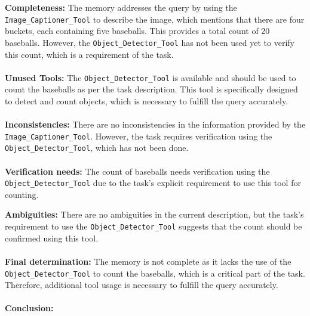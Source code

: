 \begin{plannerbox}
\textbf{Completeness:}
The memory addresses the query by using the \texttt{Image\_Captioner\_Tool} to describe the image, which mentions that there are four buckets, each containing five baseballs. This provides a total count of 20 baseballs. However, the \texttt{Object\_Detector\_Tool} has not been used yet to verify this count, which is a requirement of the task.
\\\\
\textbf{Unused Tools:}
The \texttt{Object\_Detector\_Tool} is available and should be used to count the baseballs as per the task description. This tool is specifically designed to detect and count objects, which is necessary to fulfill the query accurately.
\\\\
\textbf{Inconsistencies:}
There are no inconsistencies in the information provided by the \texttt{Image\_Captioner\_Tool}. However, the task requires verification using the \texttt{Object\_Detector\_Tool}, which has not been done.
\\\\
\textbf{Verification needs:}
The count of baseballs needs verification using the \texttt{Object\_Detector\_Tool} due to the task's explicit requirement to use this tool for counting.
\end{plannerbox}

\begin{plannerbox}
\textbf{Ambiguities:}
There are no ambiguities in the current description, but the task's requirement to use the \texttt{Object\_Detector\_Tool} suggests that the count should be confirmed using this tool.
\\\\
\textbf{Final determination:}
The memory is not complete as it lacks the use of the \texttt{Object\_Detector\_Tool} to count the baseballs, which is a critical part of the task. Therefore, additional tool usage is necessary to fulfill the query accurately.
\\\\
\textbf{Conclusion:} 
\end{plannerbox}


